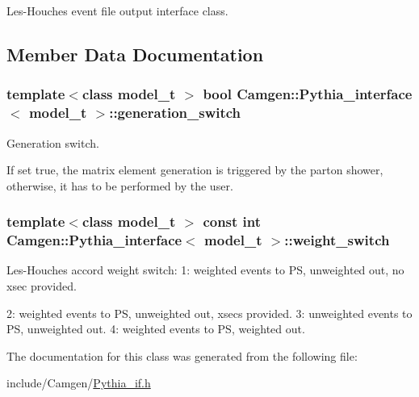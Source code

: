 Les-\/\+Houches event file output interface class. 

\subsection{Member Data Documentation}
\hypertarget{a00459_a5ecb4d493254caf2ae844b3b6a982671}{}
\subsubsection[{generation\+\_\+switch}]{\setlength{\rightskip}{0pt plus 5cm}template$<$class model\+\_\+t $>$ bool {\bf Camgen\+::\+Pythia\+\_\+interface}$<$ model\+\_\+t $>$\+::generation\+\_\+switch}\label{a00459_a5ecb4d493254caf2ae844b3b6a982671}


Generation switch. 

If set true, the matrix element generation is triggered by the parton shower, otherwise, it has to be performed by the user. \hypertarget{a00459_a75fd3fbc4856898df3bcf66530af81e0}{}
\subsubsection[{weight\+\_\+switch}]{\setlength{\rightskip}{0pt plus 5cm}template$<$class model\+\_\+t $>$ const int {\bf Camgen\+::\+Pythia\+\_\+interface}$<$ model\+\_\+t $>$\+::weight\+\_\+switch}\label{a00459_a75fd3fbc4856898df3bcf66530af81e0}


Les-\/\+Houches accord weight switch\+: 1\+: weighted events to P\+S, unweighted out, no xsec provided. 

2\+: weighted events to P\+S, unweighted out, xsecs provided. 3\+: unweighted events to P\+S, unweighted out. 4\+: weighted events to P\+S, weighted out. 

The documentation for this class was generated from the following file\+:\begin{DoxyCompactItemize}
\item 
include/\+Camgen/\hyperlink{a00749}{Pythia\+\_\+if.\+h}\end{DoxyCompactItemize}
